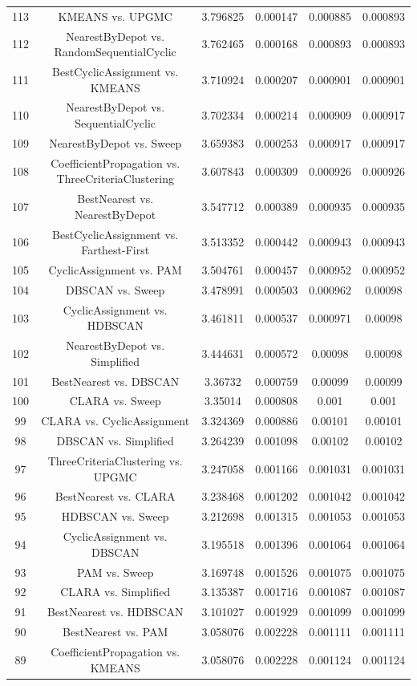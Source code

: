 \documentclass[a4paper,10pt]{article}
\begin{document}
\begin{landscape}
\begin{table}[!htp]
\begin{tabular}{cccccc}
113&KMEANS vs. UPGMC&3.796825&0.000147&0.000885&0.000893\\
112&NearestByDepot vs. RandomSequentialCyclic&3.762465&0.000168&0.000893&0.000893\\
111&BestCyclicAssignment vs. KMEANS&3.710924&0.000207&0.000901&0.000901\\
110&NearestByDepot vs. SequentialCyclic&3.702334&0.000214&0.000909&0.000917\\
109&NearestByDepot vs. Sweep&3.659383&0.000253&0.000917&0.000917\\
108&CoefficientPropagation vs. ThreeCriteriaClustering&3.607843&0.000309&0.000926&0.000926\\
107&BestNearest vs. NearestByDepot&3.547712&0.000389&0.000935&0.000935\\
106&BestCyclicAssignment vs. Farthest-First&3.513352&0.000442&0.000943&0.000943\\
105&CyclicAssignment vs. PAM&3.504761&0.000457&0.000952&0.000952\\
104&DBSCAN vs. Sweep&3.478991&0.000503&0.000962&0.00098\\
103&CyclicAssignment vs. HDBSCAN&3.461811&0.000537&0.000971&0.00098\\
102&NearestByDepot vs. Simplified&3.444631&0.000572&0.00098&0.00098\\
101&BestNearest vs. DBSCAN&3.36732&0.000759&0.00099&0.00099\\
100&CLARA vs. Sweep&3.35014&0.000808&0.001&0.001\\
99&CLARA vs. CyclicAssignment&3.324369&0.000886&0.00101&0.00101\\
98&DBSCAN vs. Simplified&3.264239&0.001098&0.00102&0.00102\\
97&ThreeCriteriaClustering vs. UPGMC&3.247058&0.001166&0.001031&0.001031\\
96&BestNearest vs. CLARA&3.238468&0.001202&0.001042&0.001042\\
95&HDBSCAN vs. Sweep&3.212698&0.001315&0.001053&0.001053\\
94&CyclicAssignment vs. DBSCAN&3.195518&0.001396&0.001064&0.001064\\
93&PAM vs. Sweep&3.169748&0.001526&0.001075&0.001075\\
92&CLARA vs. Simplified&3.135387&0.001716&0.001087&0.001087\\
91&BestNearest vs. HDBSCAN&3.101027&0.001929&0.001099&0.001099\\
90&BestNearest vs. PAM&3.058076&0.002228&0.001111&0.001111\\
89&CoefficientPropagation vs. KMEANS&3.058076&0.002228&0.001124&0.001124\\

\end{tabular}
\end{table}
\end{landscape}
\end{document}
